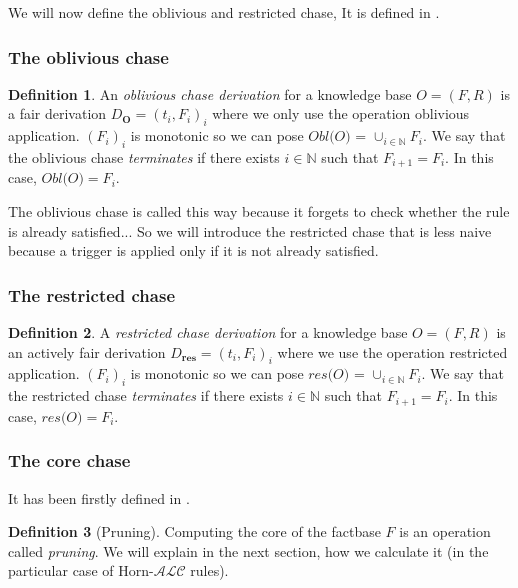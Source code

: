 \documentclass{article}
\theoremstyle{definition}
\newtheorem{definition}{Definition}[section]
\theoremstyle{remark}
\def \N {\mathbb N}
\begin{document}
We will now define the oblivious and restricted chase, It is defined in \cite{obl_res}.

\subsubsection{The oblivious chase}

\begin{definition}
An \emph{oblivious chase derivation} for a knowledge base $O= (F,R)$ is a fair derivation $D_{\textbf{O}} = (t_i,F_i)_{i} $ where we only use the operation oblivious application. $(F_i)_i$ is monotonic so we can pose \emph{$\textit{Obl(O)}$} = $\cup_{i \in \N}F_i$.
We say that the oblivious chase \emph{terminates} if there exists $i \in \N$ such that $F_{i+1} = F_i$. In this case, $\textit{Obl(O)} = F_i$.
\end{definition}


The oblivious chase is called this way because it forgets to check whether the rule is already satisfied... So we will introduce the restricted chase that is less naive because a trigger is applied only if it is not already satisfied.

\subsubsection{The restricted chase}

\begin{definition}
A \emph{restricted chase derivation} for a knowledge base $O= (F,R)$ is an actively fair derivation $D_{\textbf{res}} = (t_i,F_i)_{i} $ where we use the operation restricted application. $(F_i)_i$ is monotonic so we can pose \emph{$\textit{res(O)}$} = $\cup_{i \in \N}F_i$.
We say that the restricted chase \emph{terminates} if there exists $i \in \N$ such that $F_{i+1} = F_i$. In this case, $\textit{res(O)} = F_i$.
\end{definition}




\subsubsection{The core chase}

It has been firstly defined in \cite{core_chase}.

\begin{definition}[Pruning]
Computing the core of the factbase $F$ is an operation called \emph{pruning}. We will explain in the next section, how we calculate it (in the particular case of Horn-$\mathcal{ALC}$ rules).

\end{definition} 
\end{document}
